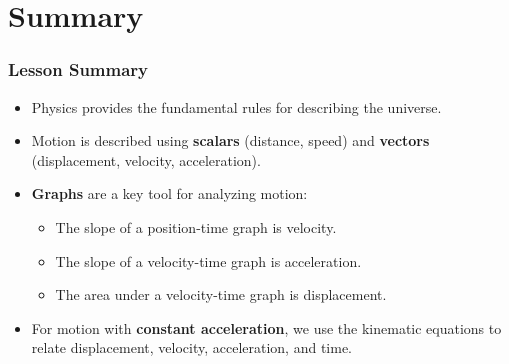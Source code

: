 \documentclass{beamer}
\begin{document}
\section{Summary}

\begin{frame}
\frametitle{Lesson Summary}
\begin{itemize}
    \item Physics provides the fundamental rules for describing the universe.
    \item Motion is described using \textbf{scalars} (distance, speed) and \textbf{vectors} (displacement, velocity, acceleration).
    \item \textbf{Graphs} are a key tool for analyzing motion:
        \begin{itemize}
            \item The slope of a position-time graph is \alert{velocity}.
            \item The slope of a velocity-time graph is \alert{acceleration}.
            \item The area under a velocity-time graph is \alert{displacement}.
        \end{itemize}
    \item For motion with \textbf{constant acceleration}, we use the kinematic equations to relate displacement, velocity, acceleration, and time.
\end{itemize}
\end{frame}
\end{document}
